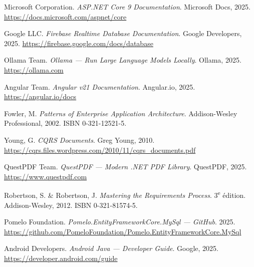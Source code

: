 \begin{enumerate}[label={[\arabic*]},leftmargin=1.8em]

  \item Microsoft Corporation.
    \textit{ASP.NET Core 9 Documentation}.
    Microsoft Docs, 2025.
    \url{https://docs.microsoft.com/aspnet/core}

  \item Google LLC.
    \textit{Firebase Realtime Database Documentation}.
    Google Developers, 2025.
    \url{https://firebase.google.com/docs/database}

  \item Ollama Team.
    \textit{Ollama — Run Large Language Models Locally}.
    Ollama, 2025.
    \url{https://ollama.com}

  \item Angular Team.
    \textit{Angular v21 Documentation}.
    Angular.io, 2025.
    \url{https://angular.io/docs}

  \item Fowler, M.
    \textit{Patterns of Enterprise Application Architecture}.
    Addison-Wesley Professional, 2002.
    ISBN 0-321-12521-5.

  \item Young, G.
    \textit{CQRS Documents}.
    Greg Young, 2010.
    \url{https://cqrs.files.wordpress.com/2010/11/cqrs_documents.pdf}

  \item QuestPDF Team.
    \textit{QuestPDF — Modern .NET PDF Library}.
    QuestPDF, 2025.
    \url{https://www.questpdf.com}

  \item Robertson, S. \& Robertson, J.
    \textit{Mastering the Requirements Process}. 3\textsuperscript{e} édition.
    Addison-Wesley, 2012.
    ISBN 0-321-81574-5.

  \item Pomelo Foundation.
    \textit{Pomelo.EntityFrameworkCore.MySql — GitHub}.
    2025.
    \url{https://github.com/PomeloFoundation/Pomelo.EntityFrameworkCore.MySql}

  \item Android Developers.
    \textit{Android Java — Developer Guide}.
    Google, 2025.
    \url{https://developer.android.com/guide}

\end{enumerate}

